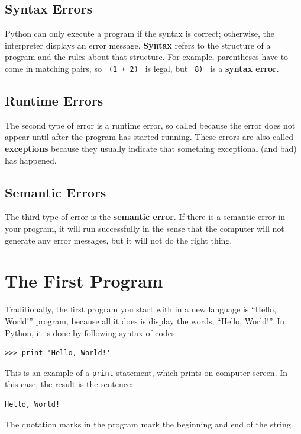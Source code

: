 \documentclass[10pt]{book}
\begin{document}
{\subsection{Syntax Errors}
Python can only execute a program if the syntax is correct; otherwise, the interpreter 
displays an error message. {\bf Syntax} refers to the structure of a program and the 
rules about that structure. For example, parentheses have to come in matching pairs, 
so \verb" (1 + 2) " is legal, but \verb" 8) " is a {\bf syntax error}. \\ 

\subsection{Runtime Errors}
The second type of error is a runtime error, so called because the error does not appear 
until after the program has started running. These errors are also called {\bf exceptions} 
because they usually indicate that something exceptional (and bad) has happened. \\

\subsection{Semantic Errors}
The third type of error is the {\bf semantic error}.  If there is a semantic error in your 
program, it will run successfully in the sense that the computer will not generate any 
error messages, but it will not do the right thing. \\

\section{The First Program}
Traditionally, the first program you start with in a new language is ``Hello, World!'' program,
because all it does is display the words, ``Hello, World!''. In Python, it is done by following
syntax of codes:

\beforeverb
\begin{verbatim}
>>> print 'Hello, World!'
\end{verbatim}
\afterverb
This is an example of a \verb"print" statement, which prints on computer screen. 
In this case, the result is the sentence:
\beforeverb
\begin{verbatim}
Hello, World!
\end{verbatim}
\afterverb
The quotation marks in the program mark the beginning and end of the string. \\


}
\end{document}
